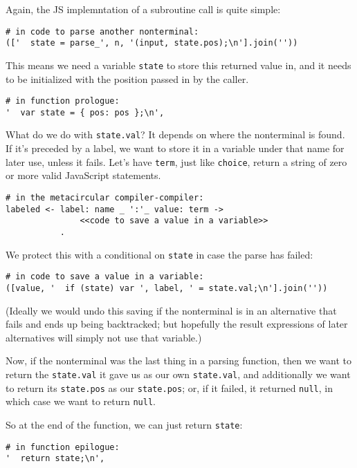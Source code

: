 \documentclass[
]{article}
\begin{document}
Again, the JS implemntation of a subroutine call is quite simple:

\begin{verbatim}
# in code to parse another nonterminal:
(['  state = parse_', n, '(input, state.pos);\n'].join(''))
\end{verbatim}

This means we need a variable \texttt{state} to store this returned
value in, and it needs to be initialized with the position passed in by
the caller.

\begin{verbatim}
# in function prologue:
'  var state = { pos: pos };\n',
\end{verbatim}

What do we do with \texttt{state.val}? It depends on where the
nonterminal is found. If it's preceded by a label, we want to store it
in a variable under that name for later use, unless it fails. Let's have
\texttt{term}, just like \texttt{choice}, return a string of zero or
more valid JavaScript statements.

\begin{verbatim}
# in the metacircular compiler-compiler:
labeled <- label: name _ ':'_ value: term ->
               <<code to save a value in a variable>>
           .
\end{verbatim}

We protect this with a conditional on \texttt{state} in case the parse
has failed:

\begin{verbatim}
# in code to save a value in a variable:
([value, '  if (state) var ', label, ' = state.val;\n'].join(''))
\end{verbatim}

(Ideally we would undo this saving if the nonterminal is in an
alternative that fails and ends up being backtracked; but hopefully the
result expressions of later alternatives will simply not use that
variable.)

Now, if the nonterminal was the last thing in a parsing function, then
we want to return the \texttt{state.val} it gave us as our own
\texttt{state.val}, and additionally we want to return its
\texttt{state.pos} as our \texttt{state.pos}; or, if it failed, it
returned \texttt{null}, in which case we want to return \texttt{null}.

So at the end of the function, we can just return \texttt{state}:

\begin{verbatim}
# in function epilogue:
'  return state;\n',
\end{verbatim}
\end{document}
